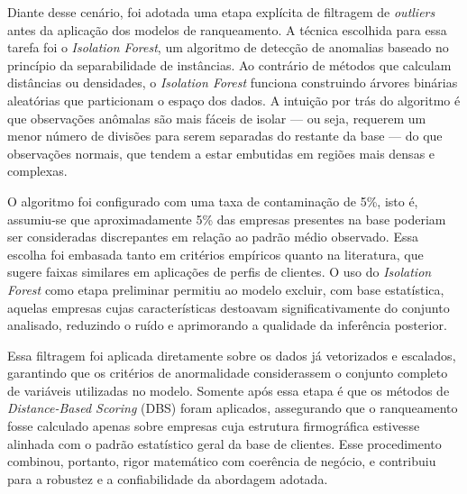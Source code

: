 Diante desse cenário, foi adotada uma etapa explícita de filtragem de \textit{outliers} antes da aplicação dos modelos de ranqueamento. A técnica escolhida para essa tarefa foi o \textit{Isolation Forest}, um algoritmo de detecção de anomalias baseado no princípio da separabilidade de instâncias. Ao contrário de métodos que calculam distâncias ou densidades, o \textit{Isolation Forest} funciona construindo árvores binárias aleatórias que particionam o espaço dos dados. A intuição por trás do algoritmo é que observações anômalas são mais fáceis de isolar — ou seja, requerem um menor número de divisões para serem separadas do restante da base — do que observações normais, que tendem a estar embutidas em regiões mais densas e complexas.

O algoritmo foi configurado com uma taxa de contaminação de 5\%, isto é, assumiu-se que aproximadamente 5\% das empresas presentes na base poderiam ser consideradas discrepantes em relação ao padrão médio observado. Essa escolha foi embasada tanto em critérios empíricos quanto na literatura, que sugere faixas similares em aplicações de perfis de clientes. O uso do \textit{Isolation Forest} como etapa preliminar permitiu ao modelo excluir, com base estatística, aquelas empresas cujas características destoavam significativamente do conjunto analisado, reduzindo o ruído e aprimorando a qualidade da inferência posterior.

Essa filtragem foi aplicada diretamente sobre os dados já vetorizados e escalados, garantindo que os critérios de anormalidade considerassem o conjunto completo de variáveis utilizadas no modelo. Somente após essa etapa é que os métodos de \textit{Distance-Based Scoring} (DBS) foram aplicados, assegurando que o ranqueamento fosse calculado apenas sobre empresas cuja estrutura firmográfica estivesse alinhada com o padrão estatístico geral da base de clientes. Esse procedimento combinou, portanto, rigor matemático com coerência de negócio, e contribuiu para a robustez e a confiabilidade da abordagem adotada.